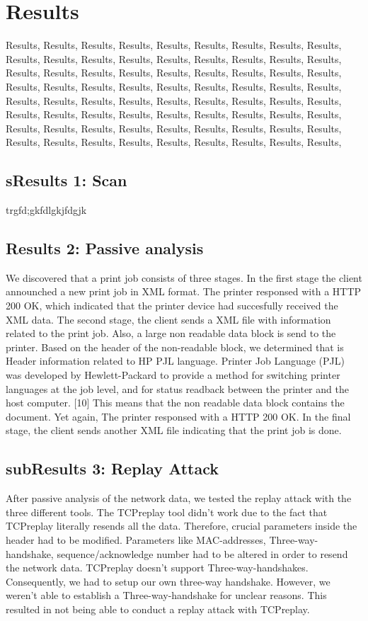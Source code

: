 \documentclass[a4paper]{article}
\begin{document}
\section{Results} %
\label{Results}
Results, Results, Results, Results, Results, Results, Results, Results, Results, Results, Results, Results, Results, Results, Results, Results, Results, Results, Results, Results, Results, Results, Results, Results, Results, Results, Results, Results, Results, Results, Results, Results, Results, Results, Results, Results, Results, Results, Results, Results, Results, Results, Results, Results, Results, Results, Results, Results, Results, Results, Results, Results, Results, Results, Results, Results, Results, Results, Results, Results, Results, Results, Results, Results, Results, Results, Results, Results, Results, Results, Results, Results, 

\subsection{sResults 1: Scan}
trgfd;gkfdlgkjfdgjk



\subsection{Results 2: Passive analysis}
We discovered that a print job consists of three stages. In the first stage the client announched a new print job in XML format. The printer responsed with a HTTP 200 OK, which indicated that the printer device had succesfully received the XML data. The second stage, the client sends a XML file with information related to the print job. Also, a large non readable data block is send  to the printer. Based
on the header of the non-readable block, we determined that is  Header
information related to HP PJL language. Printer Job Language (PJL) was
developed by Hewlett-Packard to provide a method for switching printer
languages at the job level, and for status readback between the printer
and the host computer. [10] This means that the non readable data block
contains the document. Yet again, The printer responsed with a HTTP 200
OK. In the final stage, the client sends another XML file indicating that
the print job is done.

\subsection{subResults 3: Replay Attack }
After passive analysis of the network data, we tested the replay attack with the three different tools. The TCPreplay tool didn't work due to the fact that TCPreplay literally
resends all the data. Therefore, crucial parameters inside the header had
to be modified. Parameters like MAC-addresses, Three-way-handshake,
sequence/acknowledge number had to be altered in order to resend the
network data. TCPreplay doesn't support Three-way-handshakes.
Consequently, we had to setup our own three-way handshake. However, we
weren't able to establish a Three-way-handshake for unclear reasons. This
resulted in not being able to conduct a  replay attack with TCPreplay.\\
\end{document}
